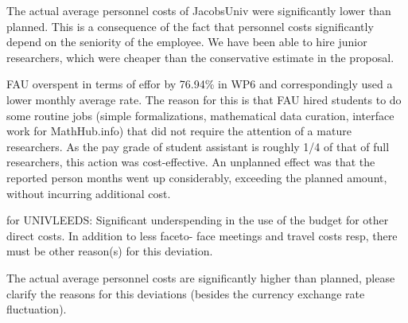 

The actual average personnel costs of JacobsUniv were significantly lower than
planned. This is a consequence of the fact that personnel costs significantly depend on
the seniority of the employee. We have been able to hire junior researchers, which were
cheaper than the conservative estimate in the proposal. 

FAU overspent in terms of effor by 76.94\% in WP6 and correspondingly used a lower monthly
average rate. The reason for this is that FAU hired students to do some routine jobs
(simple formalizations, mathematical data curation, interface work for MathHub.info) that
did not require the attention of a mature researchers. As the pay grade of student
assistant is roughly 1/4 of that of full researchers, this action was cost-effective. An
unplanned effect was that the reported person months went up considerably, exceeding the
planned amount, without incurring additional cost.


for UNIVLEEDS:
Significant underspending in the use of the budget for other direct costs. In addition to less faceto-
face meetings and travel costs resp, there must be other reason(s) for this deviation.

The actual average personnel costs are significantly higher than planned, 
please clarify the reasons for this deviations (besides the currency exchange rate fluctuation).


